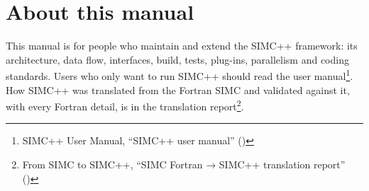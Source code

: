 \chapter*{About this manual}\label{developer_manual-index}
This manual is for people who maintain and extend the SIMC++ framework: its architecture,\allowbreak{} data flow, interfaces,
build, tests, plug-ins, parallelism and coding standards. Users who only want to run SIMC++ should read the
user manual\footnote{SIMC++ User Manual, ``SIMC++ user manual'' ()}. How SIMC++ was translated from the Fortran SIMC and validated against it, with every
Fortran detail, is in the translation report\footnote{From SIMC to SIMC++, ``SIMC Fortran → SIMC++ translation report'' ()}.

